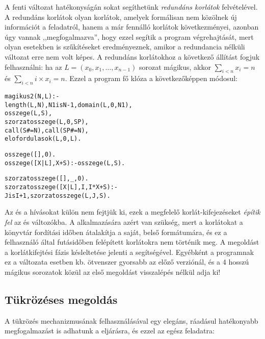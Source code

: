A fenti változat hatékonyságán sokat segíthetünk \emph{redundáns korlátok}
felvételével. A redundáns korlátok olyan korlátok, amelyek formálisan nem
közölnek új információt a feladatról, hanem a már fennálló korlátok következményei,
azonban úgy vannak ,,megfogalmazva'', hogy ezzel segítik a program végrehajtását,
mert olyan esetekben is szűkítéseket eredményeznek, amikor a redundancia nélküli
változat erre nem volt képes. A redundáns korlátokhoz a következő állítást
fogjuk felhasználni:
\br
\tetel ha az $L = (x_{0}, x_{1}, \ldots, x_{n-1})$ sorozat mágikus,
akkor $\sum_{i<n} x_{i} = n$ és $\sum_{i<n} i \times x_{i} = n$.
\br
Ezzel a program fő klóza a következőképpen módosul:
\begin{alltt}
% Az L lista egy N hosszú mágikus sorozat
magikus2(N, L) :-
    length(L, N), N1 is N-1, domain(L, 0, N1),
    osszege(L, S),               % \(\sum_{i\in [1..\cd{N}]} L_{i} = \cd{S}\)
    szorzatosszege(L, 0, SP),    % \(\sum_{i\in [1..\cd{N}]} i*L_{i} = \cd{SP}\)
    call(S #= N), call(SP #= N), % lásd a megjegyzést
    elofordulasok(L, 0, L).      % lásd az előző lapon

% osszege(L, Ossz): Ossz = \(\sum_i \cd{L}_i\)
osszege([], 0).
osszege([X|L], X+S) :- osszege(L, S).

% szorzatosszege(L, I, Ossz): Ossz = \(\cd{I}*\cd{L}_1+\cd{(I+1)}*\cd{L}_2+\ldots\)
szorzatosszege([], _, 0).
szorzatosszege([X|L], I, I*X+S) :-
    J is I+1, szorzatosszege(L, J, S).
\end{alltt}

Az  és a  hívásokat külön nem fejtjük ki, ezek
a megfelelő korlát-kifejezéseket \emph{építik fel} az  és  változókba.
A  alkalmazására azért van szükség, mert a korlátokat a \clpfd könyvtár
fordítási időben átalakítja a saját, belső formátumára, és ez a felhasználó által
futásidőben felépített korlátokra nem történik meg. A megoldást a korlátkifejtési
fázis késleltetése jelenti a  segítségével. Egyébként a programnak ez a
változata  esetben kb. ötvenszer gyorsabb az előző verziónál, és a 4 hosszú
mágikus sorozatok közül az első megoldást visszalépés nélkül adja ki!

\subsection{Tükrözéses megoldás}

A tükrözés mechanizmusának felhasználásával egy elegáns, ráadásul hatékonyabb
megfogalmazást is adhatunk a  eljárásra, és ezzel az egész
feladatra:

